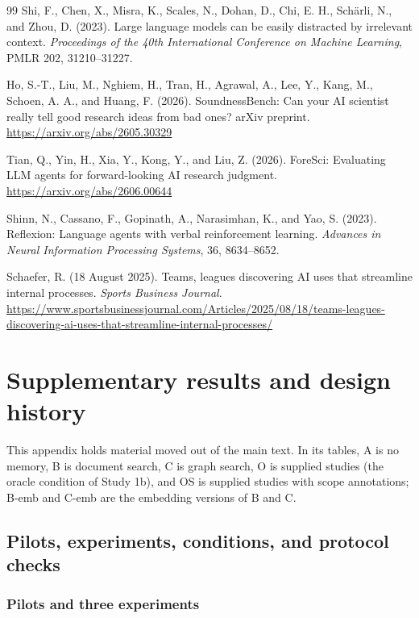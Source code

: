 \documentclass[11pt]{article}
\begin{document}
\begin{thebibliography}{99}
Shi, F., Chen, X., Misra, K., Scales, N., Dohan, D., Chi, E. H., Sch\"arli, N., and Zhou, D. (2023).
Large language models can be easily distracted by irrelevant context.
\textit{Proceedings of the 40th International Conference on Machine Learning}, PMLR 202, 31210--31227.

Ho, S.-T., Liu, M., Nghiem, H., Tran, H., Agrawal, A., Lee, Y., Kang, M., Schoen, A. A., and Huang, F. (2026).
SoundnessBench: Can your AI scientist really tell good research ideas from bad ones?
arXiv preprint.
\url{https://arxiv.org/abs/2605.30329}

Tian, Q., Yin, H., Xia, Y., Kong, Y., and Liu, Z. (2026).
ForeSci: Evaluating LLM agents for forward-looking AI research judgment.
\url{https://arxiv.org/abs/2606.00644}

Shinn, N., Cassano, F., Gopinath, A., Narasimhan, K., and Yao, S. (2023).
Reflexion: Language agents with verbal reinforcement learning.
\textit{Advances in Neural Information Processing Systems}, 36, 8634--8652.

Schaefer, R. (18 August 2025).
Teams, leagues discovering AI uses that streamline internal processes.
\textit{Sports Business Journal}.
\url{https://www.sportsbusinessjournal.com/Articles/2025/08/18/teams-leagues-discovering-ai-uses-that-streamline-internal-processes/}

\end{thebibliography}

\appendix

\section{Supplementary results and design history}
\label{app:more}

This appendix holds material moved out of the main text. In its tables, A is no memory, B is document search, C is graph search, O is supplied studies (the oracle condition of Study 1b), and OS is supplied studies with scope annotations; B-emb and C-emb are the embedding versions of B and C.

\subsection{Pilots, experiments, conditions, and protocol checks}
\label{app:history}

\subsubsection{Pilots and three experiments}
\end{document}
